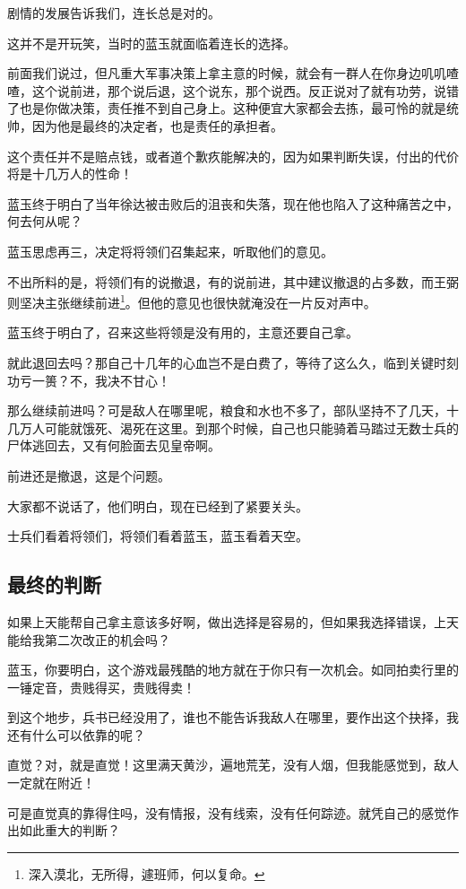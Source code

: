 \begin{multicols}{\theparacolNo}
		剧情的发展告诉我们，连长总是对的。

		这并不是开玩笑，当时的蓝玉就面临着连长的选择。

		前面我们说过，但凡重大军事决策上拿主意的时候，就会有一群人在你身边叽叽喳喳，这个说前进，那个说后退，这个说东，那个说西。反正说对了就有功劳，说错了也是你做决策，责任推不到自己身上。这种便宜大家都会去拣，最可怜的就是统帅，因为他是最终的决定者，也是责任的承担者。

		这个责任并不是赔点钱，或者道个歉疚能解决的，因为如果判断失误，付出的代价将是十几万人的性命！

		蓝玉终于明白了当年徐达被击败后的沮丧和失落，现在他也陷入了这种痛苦之中，何去何从呢？

		蓝玉思虑再三，决定将将领们召集起来，听取他们的意见。

		不出所料的是，将领们有的说撤退，有的说前进，其中建议撤退的占多数，而王弼则坚决主张继续前进\footnote{深入漠北，无所得，遽班师，何以复命。}。但他的意见也很快就淹没在一片反对声中。

		蓝玉终于明白了，召来这些将领是没有用的，主意还要自己拿。

		就此退回去吗？那自己十几年的心血岂不是白费了，等待了这么久，临到关键时刻功亏一篑？不，我决不甘心！

		那么继续前进吗？可是敌人在哪里呢，粮食和水也不多了，部队坚持不了几天，十几万人可能就饿死、渴死在这里。到那个时候，自己也只能骑着马踏过无数士兵的尸体逃回去，又有何脸面去见皇帝啊。

		前进还是撤退，这是个问题。

		大家都不说话了，他们明白，现在已经到了紧要关头。

		士兵们看着将领们，将领们看着蓝玉，蓝玉看着天空。

		\subsection{最终的判断}
		如果上天能帮自己拿主意该多好啊，做出选择是容易的，但如果我选择错误，上天能给我第二次改正的机会吗？

		蓝玉，你要明白，这个游戏最残酷的地方就在于你只有一次机会。如同拍卖行里的一锤定音，贵贱得买，贵贱得卖！

		到这个地步，兵书已经没用了，谁也不能告诉我敌人在哪里，要作出这个抉择，我还有什么可以依靠的呢？

		直觉？对，就是直觉！这里满天黄沙，遍地荒芜，没有人烟，但我能感觉到，敌人一定就在附近！

		可是直觉真的靠得住吗，没有情报，没有线索，没有任何踪迹。就凭自己的感觉作出如此重大的判断？


\end{multicols}
